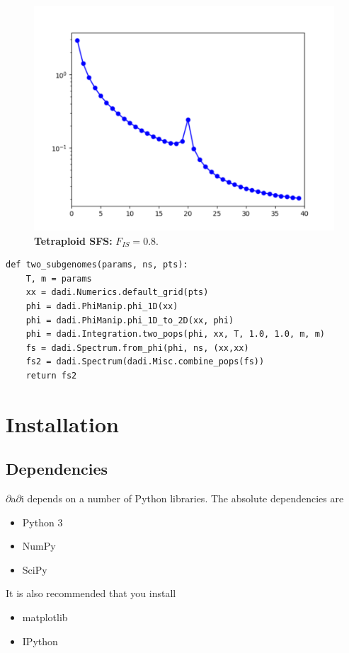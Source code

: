 \documentclass[12pt]{article}
\makeatletter
\newcommand{\dadi}{$\partial$a$\partial$i\xspace}
\newcommand{\py}[1]{\lstinline[language=Python, showstringspaces=False]@#1@}
\makeatother
\begin{document}
\begin{figure}[h]
\centering
\includegraphics[scale=0.5]{TetraploidSFS}
\caption{\textbf{Tetraploid SFS:} $F_{IS}=0.8$.\label{fig:tetraploid_sfs}}
\end{figure}

\begin{lstlisting}[caption={\textbf{Two subgenomes:} At time \py{T} in the past, an equilibrium population duplicates (autopolyploidy) and the subgenomes exchange genes symmetrically at a rate of \py{m}. The SFS for the subgenomes are then combined with the \py{combine_pops} function to create a single, polyploid SFS.}]
def two_subgenomes(params, ns, pts):
    T, m = params
    xx = dadi.Numerics.default_grid(pts)
    phi = dadi.PhiManip.phi_1D(xx)
    phi = dadi.PhiManip.phi_1D_to_2D(xx, phi)
    phi = dadi.Integration.two_pops(phi, xx, T, 1.0, 1.0, m, m)
    fs = dadi.Spectrum.from_phi(phi, ns, (xx,xx)
    fs2 = dadi.Spectrum(dadi.Misc.combine_pops(fs))
    return fs2
\end{lstlisting}

\section{Installation}

\subsection{Dependencies}

\dadi depends on a number of Python libraries. The absolute dependencies are
\begin{itemize}
\item Python 3
\item NumPy
\item SciPy
\end{itemize}
It is also recommended that you install
\begin{itemize}
\item matplotlib
\item IPython
\end{itemize}
\end{document}
